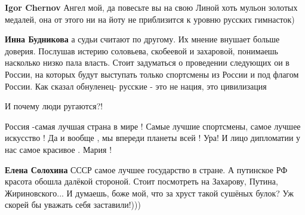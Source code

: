 \begin{itemize}
\begin{itemize}
 
\textbf{Igor Chernov} Ангел мой, да повесьте вы на свою Линой хоть мульон
золотых медалей, она от этого ни на йоту не приблизится к уровню русских
гимнасток)

 
\textbf{Инна Будникова} а судьи считают по другому. Их мнение внушает больше доверия. Послушав истерию соловьева, скобеевой и захаровой, понимаешь насколько низко пала власть. Стоит задуматься о проведении следующих ои в России, на которых будут выступать только спортсмены из России и под флагом России. Как сказал обнуленец- русские - это не нация, это цивилизация

 
И почему люди ругаются?!

\end{itemize}

 

Россия -самая лучшая страна в мире ! Самые лучшие спортсмены, самое лучшее
искусство ! Да и вообще , мы впереди планеты всей ! Ура! И лицо дипломатии у
нас самое красивое . Мария ! 🤗

\begin{itemize}
 
\textbf{Елена Солохина} СССР самое лучшее государство в стране.
А путинское РФ красота обошла далёкой стороной.
Стоит посмотреть на Захарову, Путина, Жириновского... И думаешь, боже мой, что за хруст такой сушёных булок?
Уж скорей бы уважать себя заставили!)))


\end{itemize}
\end{itemize}
